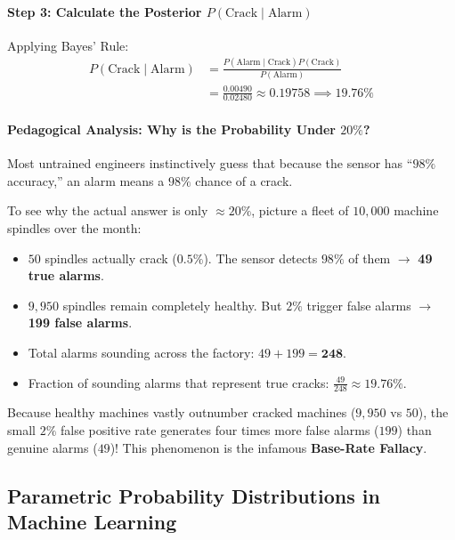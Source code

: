 \begin{example}
\paragraph{Step 3: Calculate the Posterior $P(\text{Crack} \mid \text{Alarm})$}
Applying Bayes' Rule:
\begin{align*}
P(\text{Crack} \mid \text{Alarm}) &= \frac{P(\text{Alarm} \mid \text{Crack}) P(\text{Crack})}{P(\text{Alarm})} \\
&= \frac{0.00490}{0.02480} \approx \mathbf{0.19758} \implies \mathbf{19.76\%}
\end{align*}

\paragraph{Pedagogical Analysis: Why is the Probability Under $20\%$?}
Most untrained engineers instinctively guess that because the sensor has ``$98\%$ accuracy,'' an alarm means a $98\%$ chance of a crack. 

To see why the actual answer is only $\approx 20\%$, picture a fleet of $10,000$ machine spindles over the month:
\begin{itemize}
    \item $50$ spindles actually crack ($0.5\%$). The sensor detects $98\%$ of them $\to$ \textbf{49 true alarms}.
    \item $9,950$ spindles remain completely healthy. But $2\%$ trigger false alarms $\to$ \textbf{199 false alarms}.
    \item Total alarms sounding across the factory: $49 + 199 = \mathbf{248}$.
    \item Fraction of sounding alarms that represent true cracks: $\frac{49}{248} \approx \mathbf{19.76\%}$.
\end{itemize}
Because healthy machines vastly outnumber cracked machines ($9,950$ vs $50$), the small $2\%$ false positive rate generates four times more false alarms ($199$) than genuine alarms ($49$)! This phenomenon is the infamous \textbf{Base-Rate Fallacy}.
\end{example}

\subsection{Parametric Probability Distributions in Machine Learning}\label{subsec:prob_distributions}

